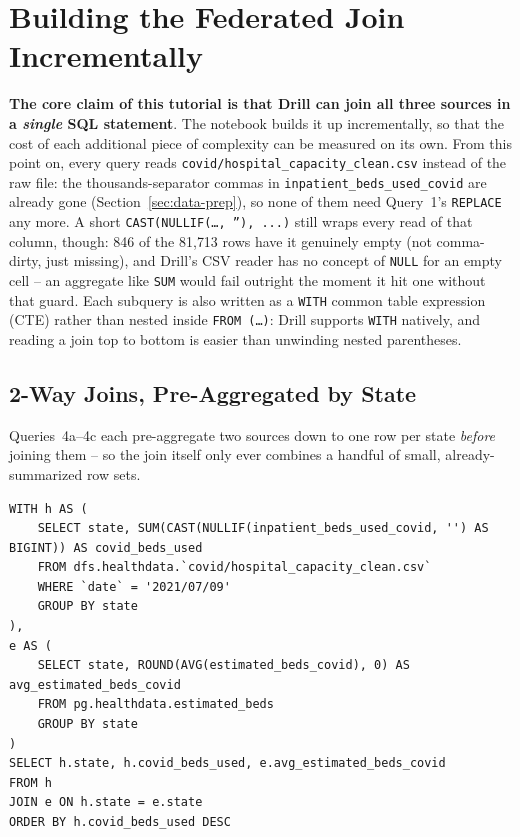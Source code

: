 \documentclass[11pt,a4paper]{article}
\begin{document}
\section{Building the Federated Join Incrementally}
\label{sec:federated-join}

\textbf{The core claim of this tutorial is that Drill can join all three sources in a
\emph{single} SQL statement}. The notebook builds it up incrementally, so that the cost of each additional piece of
complexity can be measured on its own. From this point on, every query reads
\texttt{covid/hospital\_capacity\_clean.csv} instead of the raw file: the thousands-separator
commas in \texttt{inpatient\_beds\_used\_covid} are already gone
(Section~\ref{sec:data-prep}), so none of them need Query~1's \texttt{REPLACE} any
more. A short \texttt{CAST(NULLIF(\ldots, ''), ...)} still wraps every read of that
column, though: 846 of the 81{,}713 rows have it genuinely empty (not comma-dirty,
just missing), and Drill's CSV reader has no concept of \texttt{NULL} for an empty
cell -- an aggregate like \texttt{SUM} would fail outright the moment it hit one
without that guard. Each subquery is also written as a
\texttt{WITH} common table expression (CTE) rather than nested inside \texttt{FROM
(\ldots)}: Drill supports \texttt{WITH} natively, and reading a join top to bottom is
easier than unwinding nested parentheses.

\subsection{2-Way Joins, Pre-Aggregated by State}
Queries~4a--4c each pre-aggregate two sources down to one row per state \emph{before}
joining them -- so the join itself only ever combines a handful of small,
already-summarized row sets.

\begin{lstlisting}[style=sqlstyle, caption={Q4a -- dfs + pg, 2-way, pre-aggregated by state.}]
WITH h AS (
    SELECT state, SUM(CAST(NULLIF(inpatient_beds_used_covid, '') AS BIGINT)) AS covid_beds_used
    FROM dfs.healthdata.`covid/hospital_capacity_clean.csv`
    WHERE `date` = '2021/07/09'
    GROUP BY state
),
e AS (
    SELECT state, ROUND(AVG(estimated_beds_covid), 0) AS avg_estimated_beds_covid
    FROM pg.healthdata.estimated_beds
    GROUP BY state
)
SELECT h.state, h.covid_beds_used, e.avg_estimated_beds_covid
FROM h
JOIN e ON h.state = e.state
ORDER BY h.covid_beds_used DESC
\end{lstlisting}
\end{document}
